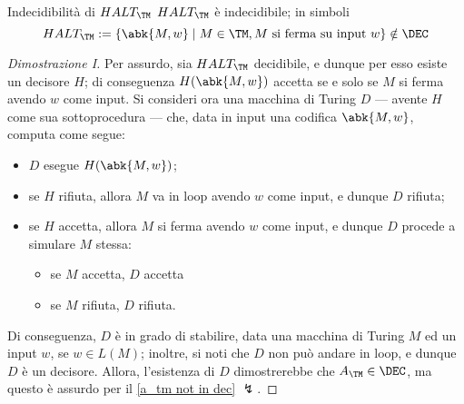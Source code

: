 \documentclass[a4paper, 12pt]{report}
\begin{document}
    \begin{framedthm}{Indecidibilità di $HALT_\TM$}
        $HALT_\TM$ è indecidibile; in simboli $$HALT_\TM := \{\abk{M, w} \mid M \in \TM , M \ \textrm{si ferma su input} \ w\} \notin \DEC$$
    \end{framedthm}

    \begin{proof}[Dimostrazione I]
        Per assurdo, sia $HALT_\TM$ decidibile, e dunque per esso esiste un decisore $H$; di conseguenza $H(\abk{M, w})$ accetta se e solo se $M$ si ferma avendo $w$ come input. Si consideri ora una macchina di Turing $D$ --- avente $H$ come sua sottoprocedura --- che, data in input una codifica $\abk{M, w}$, computa come segue:

        \begin{itemize}
            \item $D$ esegue $H(\abk{M,w})$;
            \item se $H$ rifiuta, allora $M$ va in loop avendo $w$ come input, e dunque $D$ rifiuta;
            \item se $H$ accetta, allora $M$ si ferma avendo $w$ come input, e dunque $D$ procede a simulare $M$ stessa:
            \begin{itemize}
                \item se $M$ accetta, $D$ accetta
                \item se $M$ rifiuta, $D$ rifiuta.
            \end{itemize}
        \end{itemize}

        Di conseguenza, $D$ è in grado di stabilire, data una macchina di Turing $M$ ed un input $w$, se $w \in L(M)$; inoltre, si noti che $D$ non può andare in loop, e dunque $D$ è un decisore. Allora, l'esistenza di $D$ dimostrerebbe che $A_\TM \in \DEC$, ma questo è assurdo per il \cref{a_tm not in dec} $\lightning$.
    \end{proof}
\end{document}
